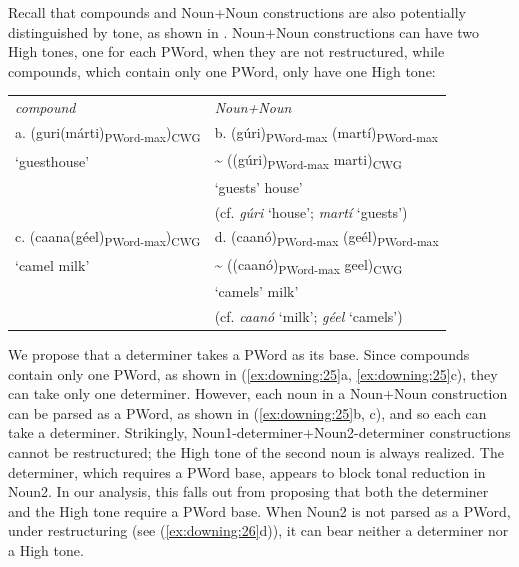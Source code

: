 \documentclass[output=paper]{langscibook}
\begin{document}
Recall that compounds and Noun+Noun constructions are also potentially distinguished by tone, as shown in . Noun+Noun constructions can have two High tones, one for each PWord, when they are not restructured, while compounds, which contain only one PWord, only have one High tone:

\ea \label{ex:downing:25}
\begin{tabularx}{\linewidth}{l | l}
 \textit{compound} &  \textit{Noun+Noun}\\
 \cline{1-2}
 
a. (guri(márti)\textsubscript{PWord-max})\textsubscript{CWG}   & b.  (gúri)\textsubscript{PWord-max} (martí)\textsubscript{PWord-max}\\
  ‘guesthouse’                                              & {\textasciitilde} ((gúri)\textsubscript{PWord-max} marti)\textsubscript{CWG}\\

                                                            & ‘guests’ house’\\
                                                            & (cf. \textit{gúri} ‘house’; \textit{martí} ‘guests’)\\
\cline{1-2}
c. (caana(géel)\textsubscript{PWord-max})\textsubscript{CWG}   & d.  (caanó)\textsubscript{PWord-max} (geél)\textsubscript{PWord-max}\\
  ‘camel milk’                                              & {\textasciitilde} ((caanó)\textsubscript{PWord-max} geel)\textsubscript{CWG} \\
                                                            & ‘camels’ milk’\\
                                                            & (cf. \textit{caanó} ‘milk’; \textit{géel} ‘camels’)\\
\cline{1-2}
\end{tabularx}
\z 

We propose that a determiner takes a PWord as its base. Since compounds contain only one PWord, as shown in (\ref{ex:downing:25}a, \ref{ex:downing:25}c), they can take only one determiner. However, each noun in a Noun+Noun construction can be parsed as a PWord, as shown in (\ref{ex:downing:25}b, c), and so each can take a determiner. Strikingly, Noun1-determiner+Noun2-determiner constructions cannot be restructured; the High tone of the second noun is always realized. The determiner, which requires a PWord base, appears to block tonal reduction in Noun2. In our analysis, this falls out from proposing that both the determiner and the High tone require a PWord base. When Noun2 is not parsed as a PWord, under restructuring (see (\ref{ex:downing:26}d)), it can bear neither a determiner nor a High tone.
\end{document}
